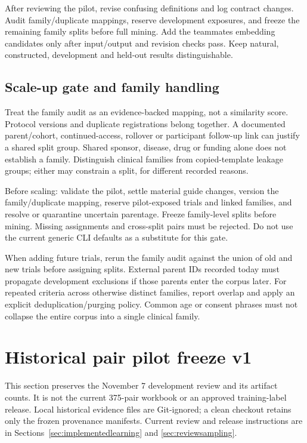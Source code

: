 \documentclass[10pt,letterpaper]{article}
\begin{document}
After reviewing the pilot, revise confusing definitions and log contract changes. Audit family/duplicate mappings, reserve development exposures, and freeze the remaining family splits before full mining. Add the teammate\textquotesingle s embedding candidates only after input/output and revision checks pass. Keep natural, constructed, development and held-out results distinguishable.

\subsection{Scale-up gate and family handling}\label{contract02-scale-up-gate-and-family-handling}

Treat the family audit as an evidence-backed mapping, not a similarity score. Protocol versions and duplicate registrations belong together. A documented parent/cohort, continued-access, rollover or participant follow-up link can justify a shared split group. Shared sponsor, disease, drug or funding alone does not establish a family. Distinguish clinical families from copied-template leakage groups; either may constrain a split, for different recorded reasons.

Before scaling: validate the pilot, settle material guide changes, version the family/duplicate mapping, reserve pilot-exposed trials and linked families, and resolve or quarantine uncertain parentage. Freeze family-level splits before mining. Missing assignments and cross-split pairs must be rejected. Do not use the current generic CLI defaults as a substitute for this gate.

When adding future trials, rerun the family audit against the union of old and new trials before assigning splits. External parent IDs recorded today must propagate development exclusions if those parents enter the corpus later. For repeated criteria across otherwise distinct families, report overlap and apply an explicit deduplication/purging policy. Common age or consent phrases must not collapse the entire corpus into a single clinical family.

\section{Historical pair pilot freeze v1}\label{sec:pairfreeze}

This section preserves the November 7 development review and its artifact
counts. It is not the current 375-pair workbook or an approved training-label
release. Local historical evidence files are Git-ignored; a clean checkout
retains only the frozen provenance manifests. Current review and release
instructions are in Sections~\ref{sec:implementedlearning} and
\ref{sec:reviewsampling}.
\end{document}
